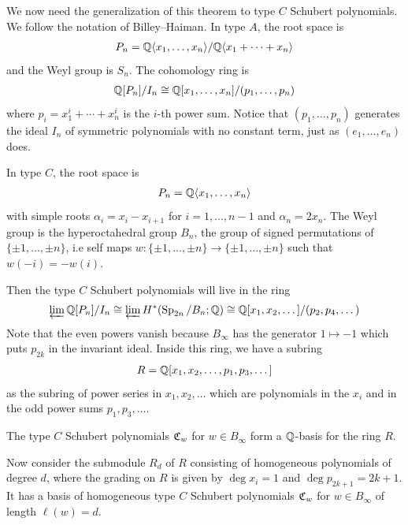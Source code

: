 \documentclass[12pt]{article}
\begin{document}
We now need the generalization of this theorem to type $C$ Schubert polynomials. We follow the notation of Billey--Haiman. In type $A$, the root space is \begin{align*}
    P_n = \mathbb{Q}\langle x_1,\dots,x_n\rangle/\mathbb{Q}\langle x_1+\cdots+x_n\rangle
\end{align*} and the Weyl group is $S_n$. The cohomology ring is \begin{align*}
    \mathbb{Q}[P_n]/I_n \cong \mathbb{Q}[x_1,\dots,x_n]/(p_1,\dots,p_n)
\end{align*} where $p_i = x_1^i+\cdots+x_n^i$ is the $i$-th power sum. Notice that $(p_1,\dots,p_n)$ generates the ideal $I_n$ of symmetric polynomials with no constant term, just as $(e_1,\dots,e_n)$ does.

In type $C$, the root space is \begin{align*}
    P_n = \mathbb{Q}\langle x_1,\dots,x_n\rangle
\end{align*} with simple roots $\alpha_i = x_i - x_{i+1}$ for $i=1,\dots,n-1$ and $\alpha_n = 2x_n$. The Weyl group is the hyperoctahedral group $B_n$, the group of signed permutations of $\{\pm 1,\dots,\pm n\}$, i.e self maps $w:\{\pm 1,\dots,\pm n\}\to\{\pm 1,\dots,\pm n\}$ such that $w(-i)=-w(i)$.

Then the type $C$ Schubert polynomials will live in the ring \begin{align*}
    \varprojlim \mathbb{Q}[P_n]/I_n \cong \varprojlim H^*(\operatorname{Sp}_{2n}/B_n;\mathbb{Q}) \cong \mathbb{Q}[x_1,x_2,\dots]/(p_2,p_4,\dots)
\end{align*} Note that the even powers vanish because $B_\infty$ has the generator $1\mapsto -1$ which puts $p_{2k}$ in the invariant ideal.  Inside this ring, we have a subring
\begin{align*}
    R = \mathbb{Q}[x_1,x_2,\dots,p_1,p_3,\dots]
\end{align*}
as the subring of power series in $x_1,x_2,\dots$ which are polynomials in the $x_i$ and in the odd power sums $p_1,p_3,\dots$.
\begin{theorem}
     The type $C$ Schubert polynomials $\mathfrak{C}_w$ for $w\in B_\infty$ form a $\mathbb{Q}$-basis for the ring $R$.
\end{theorem}

Now consider the submodule $R_d$ of $R$ consisting of homogeneous polynomials of degree $d$, where the grading on $R$ is given by $\deg x_i = 1$ and $\deg p_{2k+1} = 2k+1$. It has a basis of homogeneous type $C$ Schubert polynomials $\mathfrak{C}_w$ for $w\in B_\infty$ of length $\ell(w)=d$.
\end{document}
